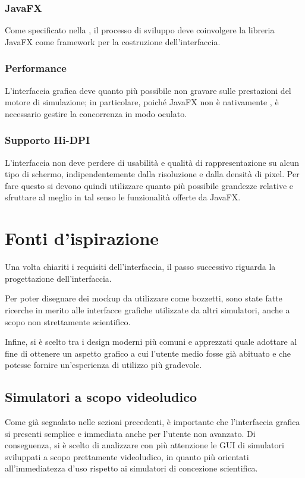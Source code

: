             \subsubsection{JavaFX}\label{subsub:jfx}
                Come specificato nella , il processo di sviluppo deve coinvolgere la libreria JavaFX come framework per la costruzione dell'interfaccia.

            \subsubsection{Performance}\label{subsub:performance}
                L'interfaccia grafica deve quanto più possibile non gravare sulle prestazioni del motore di simulazione; in particolare, poiché JavaFX non è nativamente , è necessario gestire la concorrenza in modo oculato.

            \subsubsection{Supporto Hi-DPI}\label{subsub:hidpi}
                L'interfaccia non deve perdere di usabilità e qualità di rappresentazione su alcun tipo di schermo, indipendentemente dalla risoluzione e dalla densità di pixel. Per fare questo si devono quindi utilizzare quanto più possibile grandezze relative e sfruttare al meglio in tal senso le funzionalità offerte da JavaFX.

    \section{Fonti d'ispirazione}\label{sec:ispirazione}
        Una volta chiariti i requisiti dell'interfaccia, il passo successivo riguarda la progettazione dell'interfaccia.

        Per poter disegnare dei mockup da utilizzare come bozzetti, sono state fatte ricerche in merito alle interfacce grafiche utilizzate da altri simulatori, anche a scopo non strettamente scientifico.

        Infine, si è scelto tra i design moderni più comuni e apprezzati quale adottare al fine di ottenere un aspetto grafico a cui l'utente medio fosse già abituato e che potesse fornire un'esperienza di utilizzo più gradevole.

        \subsection{Simulatori a scopo videoludico}\label{sub:videogame}
            Come già segnalato nelle sezioni precedenti, è importante che l'interfaccia grafica si presenti semplice e immediata anche per l'utente non avanzato. Di conseguenza, si è scelto di analizzare con più attenzione le GUI di simulatori sviluppati a scopo prettamente videoludico, in quanto più orientati all'immediatezza d'uso rispetto ai simulatori di concezione scientifica.

